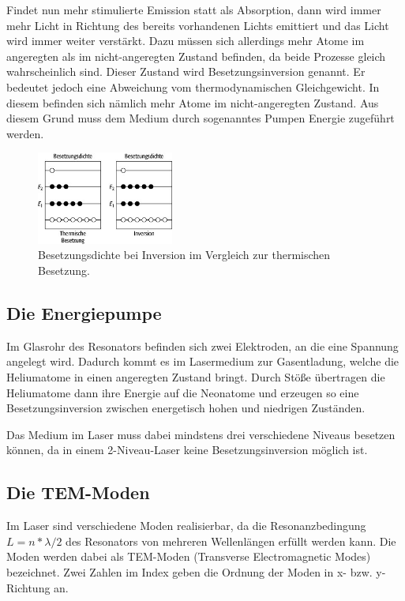 Findet nun mehr stimulierte Emission statt als Absorption, dann wird immer mehr Licht in Richtung des
bereits vorhandenen Lichts emittiert und das Licht wird immer weiter verstärkt. Dazu müssen sich allerdings mehr Atome im
angeregten als im nicht-angeregten Zustand befinden, da beide Prozesse gleich wahrscheinlich sind. Dieser Zustand wird
Besetzungsinversion genannt.
Er bedeutet jedoch eine Abweichung vom thermodynamischen Gleichgewicht. In diesem befinden sich nämlich mehr Atome im nicht-angeregten
Zustand. Aus diesem Grund muss dem Medium durch sogenanntes Pumpen Energie zugeführt werden.

\begin{figure}
\centering
\includegraphics[width=0.4\textwidth]{inversion.jpg}
\caption{Besetzungsdichte bei Inversion im Vergleich zur thermischen Besetzung.\cite{spektrum}}
\label{fig:inversion}
\end{figure}

\subsection{Die Energiepumpe}

Im Glasrohr des Resonators befinden sich zwei Elektroden, an die eine Spannung angelegt wird. Dadurch kommt es im Lasermedium
zur Gasentladung, welche die Heliumatome in einen angeregten Zustand bringt. Durch Stöße übertragen die Heliumatome dann
ihre Energie auf die Neonatome und erzeugen so eine Besetzungsinversion zwischen energetisch hohen und niedrigen
Zuständen.

Das Medium im Laser muss dabei mindstens drei verschiedene Niveaus besetzen können, da in einem 2-Niveau-Laser keine
Besetzungsinversion möglich ist.

\subsection{Die TEM-Moden}

Im Laser sind verschiedene Moden realisierbar, da die Resonanzbedingung $L = n*\lambda/2$ des Resonators von mehreren Wellenlängen
erfüllt werden kann. Die Moden werden dabei als TEM-Moden (Transverse Electromagnetic Modes) bezeichnet. Zwei Zahlen
im Index geben die Ordnung der Moden in x- bzw. y-Richtung an.

